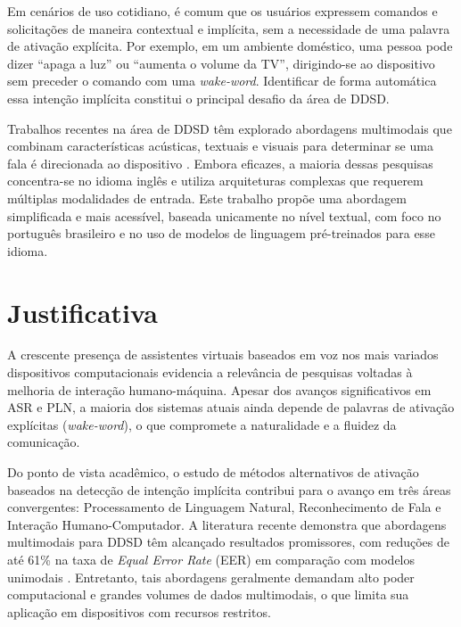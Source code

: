 \documentclass[
    12pt,                %
    openright,           %
    oneside,             %
    a4paper,             %
    english,             %
    brazil               %
]{abntex2}
\begin{document}
Em cenários de uso cotidiano, é comum que os usuários expressem comandos e solicitações de maneira contextual e implícita, sem a necessidade de uma palavra de ativação explícita. Por exemplo, em um ambiente doméstico, uma pessoa pode dizer ``apaga a luz'' ou ``aumenta o volume da TV'', dirigindo-se ao dispositivo sem preceder o comando com uma \textit{wake-word}. Identificar de forma automática essa intenção implícita constitui o principal desafio da área de DDSD.

Trabalhos recentes na área de DDSD têm explorado abordagens multimodais que combinam características acústicas, textuais e visuais para determinar se uma fala é direcionada ao dispositivo \cite{Wagner2024, Krishna2023, Nie2021}. Embora eficazes, a maioria dessas pesquisas concentra-se no idioma inglês e utiliza arquiteturas complexas que requerem múltiplas modalidades de entrada. Este trabalho propõe uma abordagem simplificada e mais acessível, baseada unicamente no nível textual, com foco no português brasileiro e no uso de modelos de linguagem pré-treinados para esse idioma.

\section{Justificativa}
\label{sec:justificativa}

A crescente presença de assistentes virtuais baseados em voz nos mais variados dispositivos computacionais evidencia a relevância de pesquisas voltadas à melhoria de interação humano-máquina. Apesar dos avanços significativos em ASR e PLN, a maioria dos sistemas atuais ainda depende de palavras de ativação explícitas (\textit{wake-word}), o que compromete a naturalidade e a fluidez da comunicação.

Do ponto de vista acadêmico, o estudo de métodos alternativos de ativação baseados na detecção de intenção implícita contribui para o avanço em três áreas convergentes: Processamento de Linguagem Natural, Reconhecimento de Fala e Interação Humano-Computador. A literatura recente demonstra que abordagens multimodais para DDSD têm alcançado resultados promissores, com reduções de até 61\% na taxa de \textit{Equal Error Rate} (EER) em comparação com modelos unimodais \cite{Wagner2024}. Entretanto, tais abordagens geralmente demandam alto poder computacional e grandes volumes de dados multimodais, o que limita sua aplicação em dispositivos com recursos restritos. 
\end{document}
